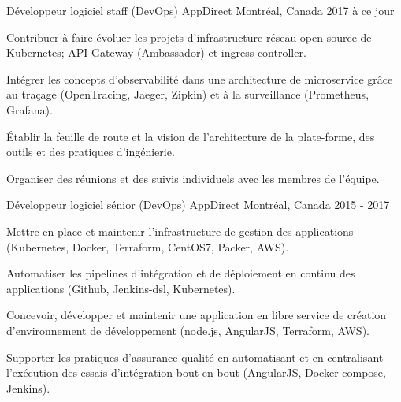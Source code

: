 
\begin{cventries}

  \cventry
    {Développeur logiciel staff (DevOps)} %
    {AppDirect} %
    {Montréal, Canada} %
    {2017 à ce jour} %
    {
      \begin{cvitems} %
        \item {Contribuer à faire évoluer les projets d'infrastructure réseau open-source de Kubernetes; API Gateway (Ambassador) et ingress-controller.}
        \item {Intégrer les concepts d'observabilité dans une architecture de microservice grâce au traçage (OpenTracing, Jaeger, Zipkin) et à la surveillance (Prometheus, Grafana).}
        \item {Établir la feuille de route et la vision de l'architecture de la plate-forme, des outils et des pratiques d'ingénierie.}
        \item {Organiser des réunions et des suivis individuels avec les membres de l'équipe.}
      \end{cvitems}
    }

  \cventry
    {Développeur logiciel sénior (DevOps)} %
    {AppDirect} %
    {Montréal, Canada} %
    {2015 - 2017} %
    {
      \begin{cvitems} %
        \item {Mettre en place et maintenir l'infrastructure de gestion des applications (Kubernetes, Docker, Terraform, CentOS7, Packer, AWS).}
        \item {Automatiser les pipelines d'intégration et de déploiement en continu des applications (Github, Jenkins-dsl, Kubernetes).}
        \item {Concevoir, développer et maintenir une application en libre service de création d'environnement de développement (node.js, AngularJS, Terraform, AWS).}
        \item {Supporter les pratiques d'assurance qualité en automatisant et en centralisant l'exécution des essais d'intégration bout en bout (AngularJS, Docker-compose, Jenkins).}
      \end{cvitems}
    }


\end{cventries}
